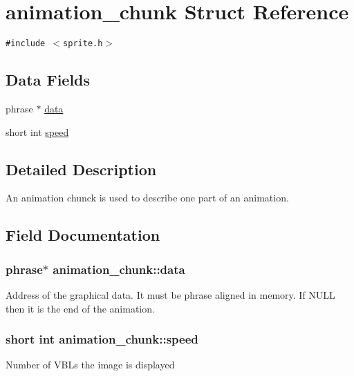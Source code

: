 \hypertarget{structanimation__chunk}{
\section{animation\_\-chunk Struct Reference}
\label{structanimation__chunk}
}
{\tt \#include $<$sprite.h$>$}

\subsection*{Data Fields}
\begin{CompactItemize}
\item 
phrase $\ast$ \hyperlink{structanimation__chunk_c8b4bbde4238c5c624957d1d467147b5}{data}
\item 
short int \hyperlink{structanimation__chunk_611245d940bd18625599a2109373381e}{speed}
\end{CompactItemize}


\subsection{Detailed Description}
An animation chunck is used to describe one part of an animation. 

\subsection{Field Documentation}
\hypertarget{structanimation__chunk_c8b4bbde4238c5c624957d1d467147b5}{
\subsubsection{\setlength{\rightskip}{0pt plus 5cm}phrase$\ast$ {\bf animation\_\-chunk::data}}}
\label{structanimation__chunk_c8b4bbde4238c5c624957d1d467147b5}


Address of the graphical data. It must be phrase aligned in memory. If NULL then it is the end of the animation. \hypertarget{structanimation__chunk_611245d940bd18625599a2109373381e}{
\subsubsection{\setlength{\rightskip}{0pt plus 5cm}short int {\bf animation\_\-chunk::speed}}}
\label{structanimation__chunk_611245d940bd18625599a2109373381e}


Number of VBLs the image is displayed 